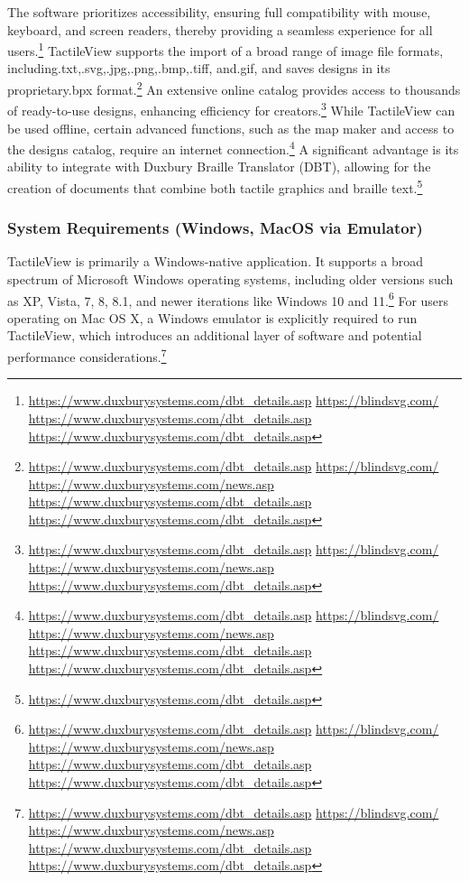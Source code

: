 The software prioritizes accessibility, ensuring full compatibility with mouse, keyboard, and screen readers, thereby providing a seamless experience for all users.\footnote{\url{https://www.duxburysystems.com/dbt_details.asp} \url{https://blindsvg.com/} \url{https://www.duxburysystems.com/dbt_details.asp} \url{https://www.duxburysystems.com/dbt_details.asp}} TactileView supports the import of a broad range of image file formats, including.txt,.svg,.jpg,.png,.bmp,.tiff, and.gif, and saves designs in its proprietary.bpx format.\footnote{\url{https://www.duxburysystems.com/dbt_details.asp} \url{https://blindsvg.com/} \url{https://www.duxburysystems.com/news.asp} \url{https://www.duxburysystems.com/dbt_details.asp} \url{https://www.duxburysystems.com/dbt_details.asp}} An extensive online catalog provides access to thousands of ready-to-use designs, enhancing efficiency for creators.\footnote{\url{https://www.duxburysystems.com/dbt_details.asp} \url{https://blindsvg.com/} \url{https://www.duxburysystems.com/news.asp} \url{https://www.duxburysystems.com/dbt_details.asp}} While TactileView can be used offline, certain advanced functions, such as the map maker and access to the designs catalog, require an internet connection.\footnote{\url{https://www.duxburysystems.com/dbt_details.asp} \url{https://blindsvg.com/} \url{https://www.duxburysystems.com/news.asp} \url{https://www.duxburysystems.com/dbt_details.asp} \url{https://www.duxburysystems.com/dbt_details.asp}} A significant advantage is its ability to integrate with Duxbury Braille Translator (DBT), allowing for the creation of documents that combine both tactile graphics and braille text.\footnote{\url{https://www.duxburysystems.com/dbt_details.asp}}

\subsubsection{System Requirements (Windows, MacOS via Emulator)}

TactileView is primarily a Windows-native application. It supports a broad spectrum of Microsoft Windows operating systems, including older versions such as XP, Vista, 7, 8, 8.1, and newer iterations like Windows 10 and 11.\footnote{\url{https://www.duxburysystems.com/dbt_details.asp} \url{https://blindsvg.com/} \url{https://www.duxburysystems.com/news.asp} \url{https://www.duxburysystems.com/dbt_details.asp} \url{https://www.duxburysystems.com/dbt_details.asp}} For users operating on Mac OS X, a Windows emulator is explicitly required to run TactileView, which introduces an additional layer of software and potential performance considerations.\footnote{\url{https://www.duxburysystems.com/dbt_details.asp} \url{https://blindsvg.com/} \url{https://www.duxburysystems.com/news.asp} \url{https://www.duxburysystems.com/dbt_details.asp} \url{https://www.duxburysystems.com/dbt_details.asp}}

